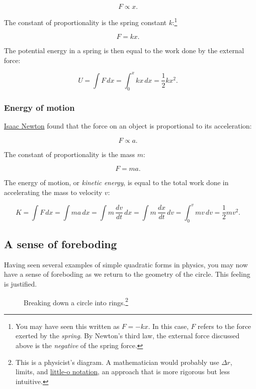 \documentclass{article}
\begin{document}
\[ F \propto x. \]

\noindent The constant of proportionality is the spring constant $k$:\footnote{You may have seen this written as $F = -kx$. In this case, $F$ refers to the force exerted by the \emph{spring}. By Newton's third law, the external force discussed above is the \emph{negative} of the spring force.}

\[ F = k x. \]

\noindent The potential energy in a spring is then equal to the work done by the external force:

\[ U = \int F\,dx = \int_0^x kx\,dx = \textstyle{\frac{1}{2}} kx^2. \]

    \subsubsection{Energy of motion} %

\href{http://en.wikipedia.org/wiki/Isaac_Newton}{Isaac Newton} found that the force on an object is proportional to its acceleration:

\[ F \propto a. \]

\noindent The constant of proportionality is the mass $m$:

\[ F = m a. \]

\noindent The energy of motion, or \emph{kinetic energy}, is equal to the total work done in accelerating the mass to velocity $v$:

\[ K = \int F\,dx = \int ma\,dx = \int m\,\frac{dv}{dt}\,dx = \int m\, \frac{dx}{dt}\,dv = \int_0^v mv\,dv = \textstyle{\frac{1}{2}} mv^2. \]


  \subsection{A sense of foreboding} %
  \label{sec:a_sense_of_foreboding}

Having seen several examples of simple quadratic forms in physics, you may now have a sense of foreboding as we return to the geometry of the circle. This feeling is justified.

\begin{figure}
\begin{center}
\end{center}
\caption{Breaking down a circle into rings.\footnote{This is a physicist's diagram. A mathematician would probably use $\Delta r$, limits, and \href{http://en.wikipedia.org/wiki/Big_O_notation#Little-o_notation}{little-o notation}, an approach that is more rigorous but less intuitive.}\label{fig:circular-area}}
\end{figure}
\end{document}
